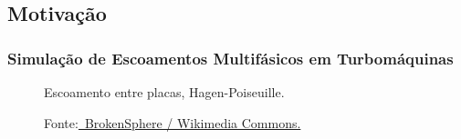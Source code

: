 \documentclass{beamer}
\def\stackalignment{r}
\begin{document}
\subsection{Motivação} %
\begin{frame}
  \frametitle{Simulação de Escoamentos Multifásicos em Turbomáquinas}
  
  \begin{minipage}{.6\textwidth}
    \def\stackalignment{l}
    \begin{figure}
       {\raggedleft \tiny Escoamento entre placas, Hagen-Poiseuille.}
    \end{figure}
  \end{minipage}
  \begin{minipage}{.3\textwidth}
    \begin{figure}
       {\raggedleft \tiny Fonte:\href{https://commons.wikimedia.org/wiki/File:Washing_machine_agitator.JPG}
	{\textcopyright \ BrokenSphere / Wikimedia Commons.}}
    \end{figure}
  \end{minipage}
  

\end{frame}
\end{document}
